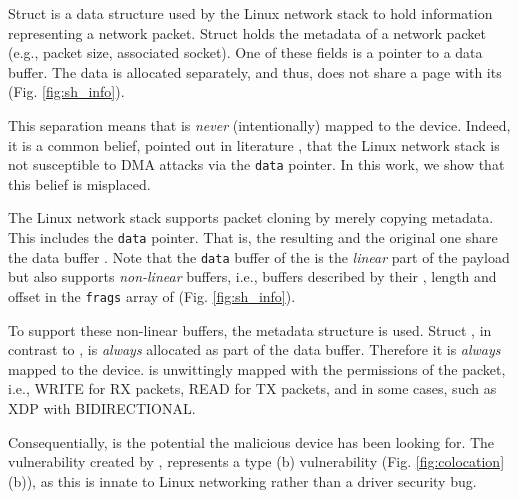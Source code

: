 Struct \skb{} is a data structure used by the Linux network stack to hold information representing a network packet. Struct \skb{} holds the metadata of a network packet (e.g., packet size, associated socket). One of these fields is a pointer to a data buffer. The data is allocated separately, and thus, does not share a page with its \skb{} (Fig. \ref{fig:sh_info}). 

This separation means that \skb{} is \emph{never} (intentionally) mapped to the device. Indeed, it is a common belief, pointed out in literature \cite{thunder}, that the Linux network stack is not susceptible to DMA attacks via the \texttt{data} pointer. In this work, we show that this belief is misplaced.

The Linux network stack supports packet cloning by merely copying \skb{} metadata. This includes the \texttt{data} pointer. That is, the resulting \skb{} and the original one share the data buffer \cite{drivers2005linux}. Note that the \texttt{data} buffer of the \skb{} is the \emph{linear} part of the payload but \skb{} also supports \emph{non-linear} buffers, i.e., buffers described by their \page{}, length and offset in the \texttt{frags} array of \shinfo{} (Fig. \ref{fig:sh_info}). 

To support these non-linear buffers, the \shinfo{} metadata structure is used.
Struct \shinfo{}, in contrast to \skb{}, is \emph{always} allocated as part of the data buffer. Therefore it is \emph{always} mapped to the device. \shinfo{} is unwittingly mapped with the permissions of the packet, i.e., WRITE for RX packets, READ for TX packets, and in some cases, such as XDP \cite{xdp} with BIDIRECTIONAL.

Consequentially, \shinfo{} is the potential \means the malicious device has been looking for. The \subpage{} vulnerability created by \shinfo{}, represents a type (b) vulnerability (Fig. \ref{fig:colocation} (b)), as this is innate to Linux networking rather than a driver security bug. 

